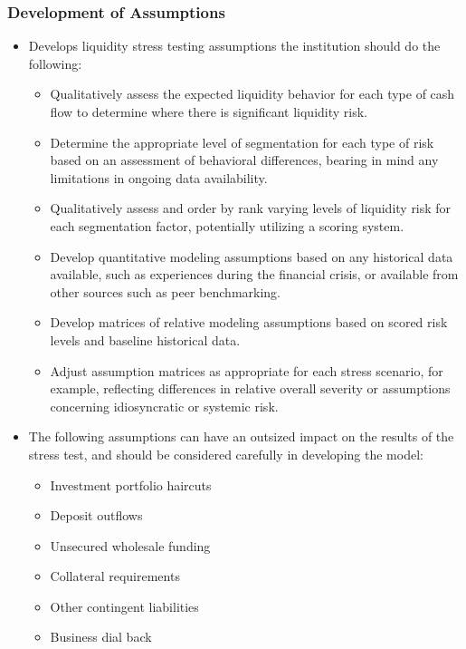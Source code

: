 \subsubsection{Development of Assumptions}
\begin{itemize}
\item Develops liquidity stress testing assumptions the institution should do the following:
    \begin{itemize}
    \item Qualitatively assess the expected liquidity behavior for each type of cash flow to determine where there is significant liquidity risk.
    \item Determine the appropriate level of segmentation for each type of risk based on an assessment of behavioral differences, bearing in mind any limitations in ongoing data availability.
    \item Qualitatively assess and order by rank varying levels of liquidity risk for each segmentation factor, potentially utilizing a scoring system.
    \item Develop quantitative modeling assumptions based on any historical data available, such as experiences during the financial crisis, or available from other sources such as peer benchmarking.
    \item Develop matrices of relative modeling assumptions based on scored risk levels and baseline historical data.
    \item Adjust assumption matrices as appropriate for each stress scenario, for example, reflecting differences in relative overall severity or assumptions concerning idiosyncratic or systemic risk.
    \end{itemize}
    
\item The following assumptions can have an outsized impact on the results of the stress test, and should be considered carefully in developing the model:
    \begin{itemize}
    \item Investment portfolio haircuts
    \item Deposit outflows
    \item Unsecured wholesale funding
    \item Collateral requirements
    \item Other contingent liabilities
    \item Business dial back
    \end{itemize}
    
\end{itemize}



